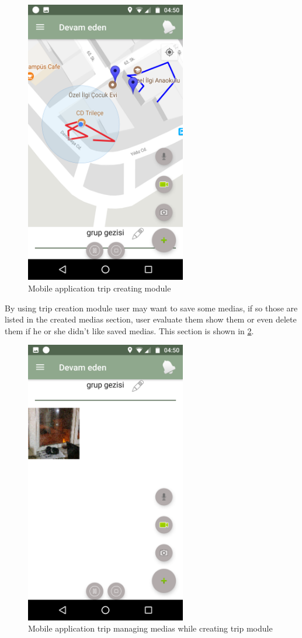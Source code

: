 \begin{figure}[!htbp]
\centering
\includegraphics[width=70mm,scale=0.7]{projectChapters/images/tripCreateSection.png}
\caption{Mobile application trip creating module}
\label{fig:tripCreateSection}
\end{figure}

\newpage

By using trip creation module user may want to save some medias, if so those are listed in the created medias section, user evaluate them show them or even delete them if he or she didn't like saved medias. This section is shown in \ref{fig:createdMedias}.

\begin{figure}[!htbp]
\centering
\includegraphics[width=70mm,scale=0.7]{projectChapters/images/createdMedias.png}
\caption{Mobile application trip managing medias while creating trip module}
\label{fig:createdMedias}
\end{figure}



